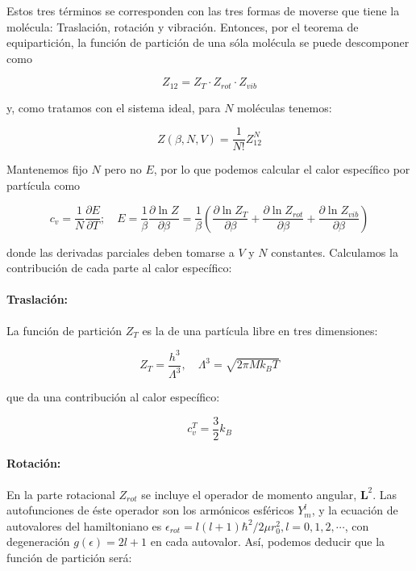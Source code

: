 \documentclass[11pt, a4paper]{article} %
\theoremstyle{named}
\begin{document}
            Estos tres términos se corresponden con las tres formas de moverse que tiene la molécula: Traslación, rotación y vibración. Entonces, por el teorema de equipartición, la función de partición de una sóla molécula se puede descomponer como

            \begin{equation}
                Z_{12} = Z_T \cdot Z_{rot} \cdot Z_{vib}
            \end{equation}

            y, como tratamos con el sistema ideal, para $N$ moléculas tenemos:

            $$
            Z(\beta, N, V) = \frac{1}{N!} Z_{12}^N
            $$

            Mantenemos fijo $N$ pero no $E$, por lo que podemos calcular el calor específico por partícula como

            \begin{equation}\label{eq:diatCtot}
                c_{v}=\frac{1}{N} \frac{\partial E}{\partial T} ; \quad E=\frac{1}{\beta} \frac{\partial \ln Z}{\partial \beta}=\frac{1}{\beta}\left(\frac{\partial \ln Z_{T}}{\partial \beta}+\frac{\partial \ln Z_{r o t}}{\partial \beta}+\frac{\partial \ln Z_{vib}}{\partial \beta}\right)
            \end{equation}

            donde las derivadas parciales deben tomarse a $V$ y $N$ constantes. Calculamos la contribución de cada parte al calor específico:

            \paragraph{Traslación:} La función de partición $Z_T$ es la de una partícula libre en tres dimensiones:

            \begin{equation}
                Z_{T}=\frac{h^{3}}{\Lambda^{3}}, \quad \Lambda^{3}=\sqrt{2 \pi M k_{B} T}
            \end{equation}

            que da una contribución al calor específico:

            \begin{equation}
                c_v^T = \frac{3}{2} k_B
            \end{equation}

            \paragraph{Rotación:} En la parte rotacional $Z_{rot}$ se incluye el operador de momento angular, $\mathbf{L}^2$. Las autofunciones de éste operador son los armónicos esféricos $Y_m^l$, y la ecuación de autovalores del hamiltoniano es $\epsilon_{rot} = l(l+1) \hbar^2 / 2 \mu r_0^2, l = 0,1,2, \cdots$, con degeneración $g(\epsilon) = 2l+1$ en cada autovalor. Así, podemos deducir que la función de partición será:
\end{document}

